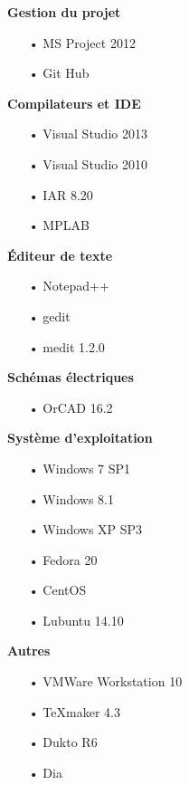 \documentclass[10pt,a4paper,final]{article}
\begin{document}
\begin{spacing}{1.5}
\begin{flushleft}
\begin{multicols}{3}
\textbf{Gestion du projet}
\begin{itemize}
\item[•]MS Project 2012
\item[•]Git Hub
\end{itemize}

\textbf{Compilateurs et IDE}
\begin{itemize}
\item[•]Visual Studio 2013
\item[•]Visual Studio 2010
\item[•]IAR 8.20
\item[•]MPLAB
\end{itemize}

\textbf{Éditeur de texte}
\begin{itemize}
\item[•]Notepad++
\item[•]gedit
\item[•]medit 1.2.0
\end{itemize}
\textbf{Schémas électriques}

\begin{itemize}
\item[•]OrCAD 16.2
\end{itemize}

\bigskip

\textbf{Système d'exploitation}
\begin{itemize}
\item[•]Windows 7 SP1
\item[•]Windows 8.1
\item[•]Windows XP SP3
\item[•]Fedora 20
\item[•]CentOS
\item[•]Lubuntu 14.10
\end{itemize}

\textbf{Autres}
\begin{itemize}
\item[•]VMWare Workstation 10
\item[•]TeXmaker 4.3
\item[•]Dukto R6
\item[•]Dia
\end{itemize}

\end{multicols}
\end{flushleft}
\begin{flushleft}
\HRule
\end{flushleft}


\end{spacing}
\end{document}
